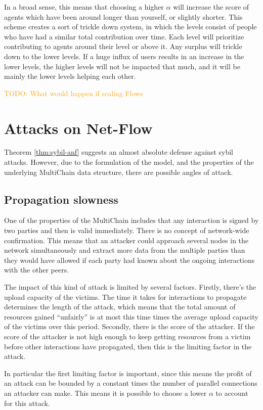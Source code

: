 \documentclass[a4paper,11pt]{book}
\newcommand\nicetohave[1]{\textcolor{orange}{TODO: #1}}
\theoremstyle{definition}
\begin{document}
In a broad sense, this means that choosing a higher $\alpha$ will increase the score 
of agents which have been around longer than yourself, or slightly shorter. This
scheme creates a sort of trickle down system, in which the levels consist of people
who have had a similar total contribution over time. Each level will prioritize
contributing to agents around their level or above it. Any surplus will trickle down
to the lower levels. If a huge influx of users results in an increase in the lower
levels, the higher levels will not be impacted that much, and it will be mainly the
lower levels helping each other.

\nicetohave{What would happen if scaling Flows}


\section{Attacks on Net-Flow}

Theorem \ref{thm:sybil-anf} suggests an almost absolute defense against sybil attacks. However,
due to the formulation of the model, and the properties of the underlying MultiChain data structure,
there are possible angles of attack.

\subsection{Propagation slowness}

One of the properties of the MultiChain includes that any interaction is signed by two parties and
then is valid immediately. There is no concept of network-wide confirmation. This means that an attacker
could approach several nodes in the network simultaneously and extract more data from the multiple parties
than they would have allowed if each party had known about the ongoing interactions with the other peers.

The impact of this kind of attack is limited by several factors. Firstly, there's the upload capacity of the
victims. The time it takes for interactions to propagate determines the length of the attack, which means that
the total amount of resources gained ``unfairly'' is at most this time times the average upload capacity of
the victims over this period. Secondly, there is the score of the attacker. If the score of the attacker is
not high enough to keep getting resources from a victim before other interactions have propagated, then this
is the limiting factor in the attack. 

In particular the first limiting factor is important, since this means the profit of an attack can be bounded
by a constant times the number of parallel connections an attacker can make. This means it is possible
to choose a lower $\alpha$ to account for this attack. 
\end{document}
